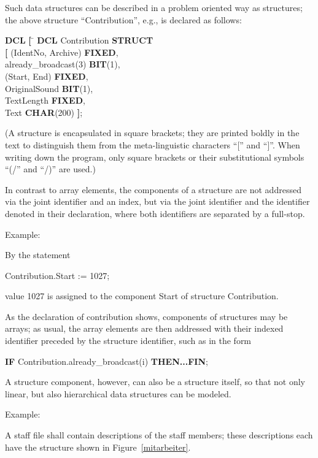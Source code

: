Such data structures can be described in a problem oriented way as
structures; the above structure ``Contribution'', e.g., is declared as
follows:

\begin{tabbing}
{\bf DCL} \= {\bf [} \= \kill
{\bf DCL} \>         \> Contribution {\bf STRUCT} \\
          \> {\bf [} \> (IdentNo, Archive) {\bf FIXED},\\
          \>         \> already\_broadcast(3) {\bf BIT}(1),\\
          \>         \> (Start, End) {\bf FIXED},\\
          \>         \> OriginalSound {\bf BIT}(1),\\
          \>         \> TextLength {\bf FIXED},\\
          \>         \> Text {\bf CHAR}(200) {\bf ]};
\end{tabbing}

(A structure is encapsulated in square brackets; they are printed boldly in
the text to distinguish them from the meta-linguistic characters ``[''
and ``]''. When writing down the program, only square brackets or their
substitutional symbols ``(/'' and ``/)'' are used.)

In contrast to array elements, the components of a structure are not
addressed via the joint identifier and an index, but via the joint
identifier and the identifier denoted in their declaration, where both
identifiers are separated by a full-stop.

Example:

By the statement

Contribution.Start := 1027;

value 1027 is assigned to the component Start of structure Contribution.

As the declaration of contribution shows, components of structures may be
arrays; as usual, the array elements are then addressed with their
indexed identifier preceded by the structure identifier, such as in the
form

{\bf IF} Contribution.already\_broadcast(i) {\bf THEN...FIN};

A structure component, however, can also be a structure itself, so that not only
linear, but also hierarchical data structures can be modeled.

Example:

A staff file shall contain descriptions of the staff members; these
descriptions each have the structure shown in Figure~\ref{mitarbeiter}.
\newpage

